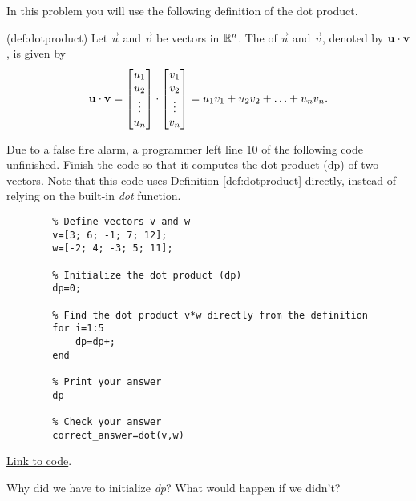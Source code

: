 \documentclass{ximera}
\begin{document}
\begin{problem}\label{prob_oct_vec_loop}
    In this problem you will use the following definition of the dot product.

    \begin{definition}(def:dotproduct)
        Let $\vec{u}$ and $\vec{v}$ be vectors in $\mathbb{R}^n$.  The  of $\vec{u}$ and $\vec{v}$, denoted by
        $\mathbf{u}\cdot \mathbf{v}$, is given by
        \begin{align*}
          \mathbf{u}\cdot\mathbf{v}=\begin{bmatrix}u_1\\u_2\\\vdots\\u_n\end{bmatrix}\cdot\begin{bmatrix}v_1\\v_2\\\vdots\\v_n\end{bmatrix}=u_1v_1+u_2v_2+\ldots+u_nv_n.
        \end{align*}
      \end{definition}
\begin{question}
    Due to a false fire alarm, a programmer left line 10 of the following code unfinished.  Finish the code so that it computes the dot product (dp) of two vectors.  Note that this code uses Definition \ref{def:dotproduct} directly, instead of relying on the built-in \emph{dot} function.

    \begin{verbatim}
        % Define vectors v and w
        v=[3; 6; -1; 7; 12];
        w=[-2; 4; -3; 5; 11];

        % Initialize the dot product (dp)
        dp=0;

        % Find the dot product v*w directly from the definition
        for i=1:5
            dp=dp+;
        end

        % Print your answer
        dp

        % Check your answer
        correct_answer=dot(v,w)
    \end{verbatim}

    \href{https://sagecell.sagemath.org/?z=eJxdjssKwjAQRfeB_MPdFHwVjPUBSlaK4M59EZEmxWBNyhgT9OtNqRud3cy9nDkZdro2ViPoyjt6IOBiFSJnQZYFlsgFVhCz04azKMt8hjnyAgsI0Z04y3CwxptLY94a_qqhnEdLTj0rj4Fqh5ypVk6_3b1J8P9WGEUoQ0mgeaEmd-8bnVciO8tZ7QhGivWCM6RJQNWOE1Jb1XOPZKzHyz0p6T-ipu5rH22vurr9RpWj7tu532VyGYRJHH4ATLJPyQ==&lang=octave&interacts=eJyLjgUAARUAuQ==}{Link to code}.

    Why did we have to initialize \emph{dp}?  What would happen if we didn't?
\end{question}
\end{problem}
 
\end{document}
